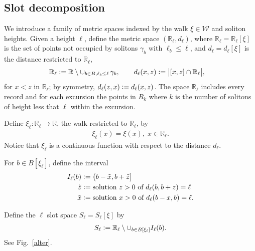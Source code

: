 \documentclass[12pt]{article}
\numberwithin{equation}{section}
\newcommand{\RR}{\mathbb R}
\newcommand{\cW}{\mathcal W}
\begin{document}
\subsection{Slot decomposition}
\label{subsecsol}

We introduce a family of metric spaces indexed by the walk $\xi\in\cW$ and soliton heights. Given a height $\ell$, define the metric space $(\RR_\ell, d_\ell)$, where $\RR_\ell=\RR_\ell[\xi]$ is the set of points not occupied by solitons $\gamma_b$ with $\ell_b\leq\ell$, and $d_\ell=d_\ell[\xi]$ is the distance restricted to $\RR_\ell$, 
\begin{align}
 \label{rel1}
 \RR_\ell&\vcentcolon =\RR\setminus \cup_{b\in B, \ell_b\le \ell}\,\gamma_b, \qquad d_\ell(x, z) \vcentcolon = \bigl|[x, z ]\cap \RR_\ell\bigr|, 
\end{align}
for $x<z$ in $\RR_\ell$; by symmetry, $d_\ell(z, x)\vcentcolon =d_\ell(x, z)$.
The space $\RR_\ell$ includes every record and for each excursion the points in $R_k$ where $k$ is the number of solitons of height less that $\ell$ within the excursion.

Define $\xi_\ell:\RR_\ell\to\RR$, the walk restricted to $\RR_\ell$, by
 \begin{gather}
 \label{xil1}
  \xi_\ell(x) =\xi(x), \; x\in \RR_\ell.
\end{gather}
Notice that $\xi_\ell$ is a continuous function with respect to the distance $d_\ell$.

For $b\in B[\xi_\ell]$, define the interval
\begin{align}
 I_\ell(b)&\vcentcolon = \bigl(b-\tilde x,b+\tilde z\bigr]\label{defI}
 \\
 \tilde z &\vcentcolon =\text{solution $z>0$ of } d_\ell(b, b+z)=\ell\notag
 \\
 \tilde x &\vcentcolon =\text{solution $x>0$ of } d_\ell(b-x,b)=\ell.\notag
\end{align}


Define the $\ell$ slot space $S_\ell=S_\ell[\xi]$ by
\begin{align}
  \label{2}
  S_\ell\vcentcolon = \RR_\ell \setminus \cup_{b\in B[\xi_\ell]} I_\ell(b).
\end{align}
See Fig.~\ref{alter}.
\end{document}

